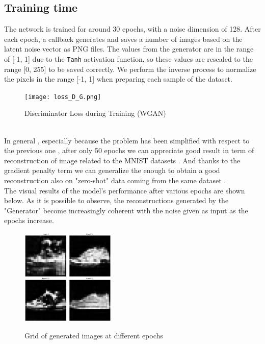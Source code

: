 \subsection*{Training time}
The network is trained for around 30 epochs, with a noise dimension 
of 128. After each epoch, a callback generates and saves a number of 
images based on the latent noise vector as PNG files. 
The values from the generator are in the range of [-1, 1] due 
to the \texttt{Tanh} activation function, so these values 
are rescaled to the range [0, 255] to be saved correctly. 
We perform the inverse process to normalize the pixels in 
the range [-1, 1] when preparing each sample of the dataset.
\\
\begin{figure}[h!]
\texttt{[image: loss\_D\_G.png]}
\caption{Discriminator Loss during Training (WGAN)}
\end{figure}
\\
In general , especially because the problem has been simplified with respect 
to the previous one , after only 50 epochs we can appreciate good result in term of 
reconstruction of image related to the MNIST datasets .
And thanks to the gradient penalty term we can generalize the enough to obtain 
a good reconstruction also on "zero-shot" data coming from the same dataset . 
\\
The visual results of the model's performance after various epochs are shown below. 
As it is possible to observe, the reconstructions generated by the "Generator" become 
increasingly coherent with the noise given as input as the epochs increase.

\begin{figure}[h!]
    \centering
    \caption{Grid of generated images at different epochs}
    \includegraphics[width=0.4\textwidth]{images/Epochs.png}
    \label{fig:grid_plot}
\end{figure}